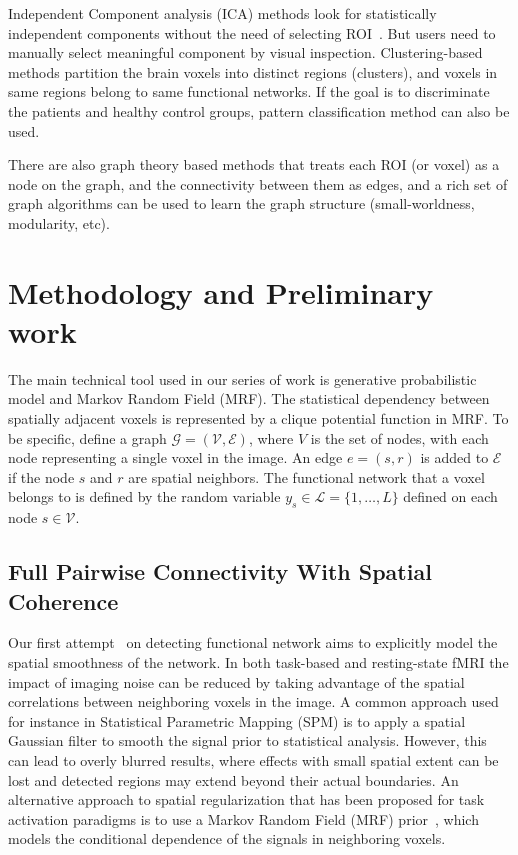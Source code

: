\documentclass[12pt]{article}
\begin{document}
Independent Component analysis (ICA) methods look for statistically independent
components without the need of selecting ROI~\cite{calhoun2001spatial}. But
users need to manually select meaningful component by visual
inspection. Clustering-based methods partition the brain voxels into distinct
regions (clusters), and voxels in same regions belong to same functional
networks. If the goal is to discriminate the patients and healthy control
groups, pattern classification method can also be used.

There are also graph theory based methods that treats each ROI (or voxel) as a
node on the graph, and the connectivity between them as edges, and a rich set of
graph algorithms can be used to learn the graph structure (small-worldness,
modularity, etc). 


\section{Methodology and Preliminary work} 
The main technical tool used in our series of work is generative probabilistic
model and Markov Random Field (MRF). The statistical dependency between
spatially adjacent voxels is represented by a clique potential function in
MRF. To be specific, define a graph $\mathcal{G} = (\mathcal{V}, \mathcal{E})$,
where $V$ is the set of nodes, with each node representing a single voxel in the
image.  An edge $e=(s,r)$ is added to $\mathcal{E}$ if the node $s$ and $r$ are
spatial neighbors. The functional network that a voxel belongs to is defined by
the random variable $y_s \in \mathcal{L} = \{1,\dots, L\}$ defined on each node $s\in \mathcal{V}$.
\subsection{Full Pairwise Connectivity With Spatial Coherence}\label{sec:highmrf}
Our first attempt~\cite{liu2010spatial} on detecting functional network aims to
explicitly model the spatial smoothness of the network. In both task-based and
resting-state fMRI the impact of imaging noise can be reduced by taking
advantage of the spatial correlations between neighboring voxels in the image. A
common approach used for instance in Statistical Parametric Mapping
(SPM)\cite{worsley_analysis_1995} is to apply a spatial Gaussian filter to
smooth the signal prior to statistical analysis. However, this can lead to
overly blurred results, where effects with small spatial extent can be lost and
detected regions may extend beyond their actual boundaries. An alternative
approach to spatial regularization that has been proposed for task activation
paradigms is to use a Markov Random Field (MRF)
prior~\cite{ou_spatial_2005,descombes_spatio-temporal_1998,descombes_fmri_1998,woolrich_fully_2004,cosman_exact_2004},
which models the conditional dependence of the signals in neighboring voxels.
\end{document}
